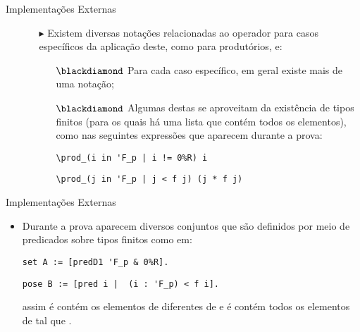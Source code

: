 \begin{frame}[fragile]{Implementações Externas}
    \begin{itemize}
        \item[]
        \begin{itemize}
            \item[$\blacktriangleright$] Existem diversas notações relacionadas ao operador  para casos específicos da aplicação deste, como para produtórios, e:
            
            \begin{itemize}
                \item[$\blackdiamond$] Para cada caso específico, em geral existe mais de uma notação;
                
                \item[$\blackdiamond$] Algumas destas se aproveitam da existência de tipos finitos (para os quais há uma lista que contém todos os elementos), como nas seguintes expressões que aparecem durante a prova:
            
                \begin{lstlisting}[language=coq,frame=single,tabsize=1]
\prod_(i in 'F_p | i != 0%R) i
                \end{lstlisting}

                \begin{lstlisting}[language=coq,frame=single,tabsize=1]
\prod_(j in 'F_p | j < f j) (j * f j)
                \end{lstlisting}

            \end{itemize}
        \end{itemize}
    \end{itemize}
\end{frame}

\begin{frame}[fragile]{Implementações Externas}
    \begin{itemize}
        \item Durante a prova aparecem diversos conjuntos que são definidos por meio de predicados sobre tipos finitos como em:
            \begin{lstlisting}[language=coq,frame=single,tabsize=1]
set A := [predD1 'F_p & 0%R].
            \end{lstlisting}

            \begin{lstlisting}[language=coq,frame=single,tabsize=1]
pose B := [pred i |  (i : 'F_p) < f i].
            \end{lstlisting}

        assim  é contém os elementos de  diferentes de  e  é contém todos os elementos de  tal que . 
    \end{itemize}
\end{frame}